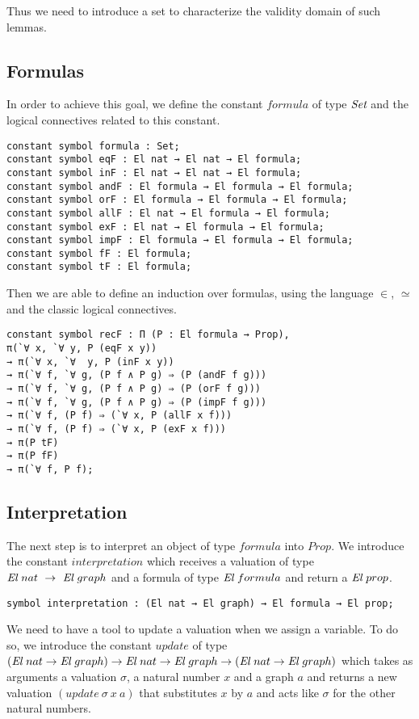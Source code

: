 \documentclass[submission,copyright,creativecommons]{eptcs}
\def\ra{\rightarrow}
\def\Set{\mbox{\it Set}}
\def\El{{\mbox{\it El}}}
\begin{document}
Thus we need to introduce a set to characterize the validity domain of such lemmas.

\subsection{Formulas}

In order to achieve this goal, we define the constant $formula$ of type $\Set$ and the logical connectives related to this constant.

\begin{lstlisting}
constant symbol formula : Set;
constant symbol eqF : El nat → El nat → El formula;
constant symbol inF : El nat → El nat → El formula;
constant symbol andF : El formula → El formula → El formula;
constant symbol orF : El formula → El formula → El formula;
constant symbol allF : El nat → El formula → El formula;
constant symbol exF : El nat → El formula → El formula;
constant symbol impF : El formula → El formula → El formula;
constant symbol fF : El formula;
constant symbol tF : El formula;
\end{lstlisting}

Then we are able to define an induction over formulas, using the language $\in$, $\simeq$ and the classic logical connectives.

\begin{lstlisting}
constant symbol recF : Π (P : El formula → Prop), 
π(`∀ x, `∀ y, P (eqF x y))
→ π(`∀ x, `∀  y, P (inF x y))
→ π(`∀ f, `∀ g, (P f ∧ P g) ⇒ (P (andF f g)))
→ π(`∀ f, `∀ g, (P f ∧ P g) ⇒ (P (orF f g)))
→ π(`∀ f, `∀ g, (P f ∧ P g) ⇒ (P (impF f g)))
→ π(`∀ f, (P f) ⇒ (`∀ x, P (allF x f)))
→ π(`∀ f, (P f) ⇒ (`∀ x, P (exF x f)))
→ π(P tF)
→ π(P fF)
→ π(`∀ f, P f);
\end{lstlisting}

\subsection{Interpretation}

The next step is to interpret an object of type $formula$ into $Prop$. We introduce the constant $interpretation$ which receives a valuation of type $\El \ nat \ \ra \ \El~graph$ and a formula of type $\El \ formula$ and return a $\El~prop$.

\begin{lstlisting}
symbol interpretation : (El nat → El graph) → El formula → El prop;
\end{lstlisting} 

We need to have a tool to update a valuation when we assign a variable. To do so, we introduce the constant $update$ of type $(\El \ nat \ra \El~graph) \ra \El \ nat \ra \El~graph \ra (\El \ nat \ra \El~graph)$ which takes as arguments a valuation $\sigma$, a natural number $x$ and a graph $a$ and returns a new valuation $(update \ \sigma \ x \ a)$ that substitutes $x$ by $a$ and acts like $\sigma$ for the other natural numbers.
\end{document}
